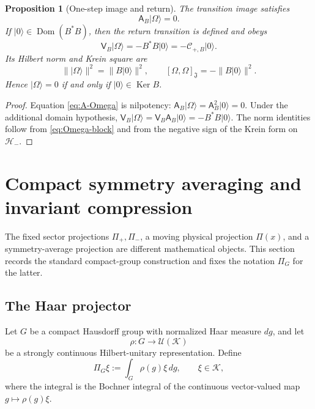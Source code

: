 \documentclass[11pt,reqno]{scrartcl}
\newcommand{\scrK}{\mathscr K}
\newcommand{\scrHm}{\mathscr H_{-}}
\newcommand{\fundJ}{\mathfrak J}
\newcommand{\Pp}{\Pi_{+}}
\newcommand{\Pm}{\Pi_{-}}
\newcommand{\Aop}{\mathsf A}
\newcommand{\Vop}{\mathsf V}
\newcommand{\ket}[1]{\lvert #1\rangle}
\newcommand{\kInner}[2]{[#1,#2]_{\fundJ}}
\DeclareMathOperator{\Dom}{Dom}
\DeclareMathOperator{\Ker}{Ker}
\theoremstyle{plain}
\newtheorem{proposition}[proposition]{Proposition}
\theoremstyle{definition}
\theoremstyle{remark}
\begin{document}
\begin{proposition}[One-step image and return]
\label{prop:Omega}
The transition image satisfies
\begin{equation}
  \boxed{\Aop_B\ket\Omega=0.}
  \label{eq:A-Omega}
\end{equation}
If \(\ket0\in\Dom(B^*B)\), then the return transition is defined and obeys
\begin{equation}
  \Vop_B\ket\Omega
  =-B^*B\ket0
  =-\mathscr C_{+,B}\ket0.
  \label{eq:V-Omega}
\end{equation}
Its Hilbert norm and Krein square are
\begin{equation}
  \|\ket\Omega\|^2=\|B\ket0\|^2,
  \qquad
  \kInner{\Omega}{\Omega}=-\|B\ket0\|^2.
  \label{eq:Omega-norms}
\end{equation}
Hence \(\ket\Omega=0\) if and only if \(\ket0\in\Ker B\).
\end{proposition}

\begin{proof}
Equation \eqref{eq:A-Omega} is nilpotency:
\(\Aop_B\ket\Omega=\Aop_B^2\ket0=0\). Under the additional domain
hypothesis,
\(\Vop_B\ket\Omega=\Vop_B\Aop_B\ket0=-B^*B\ket0\). The norm identities
follow from \eqref{eq:Omega-block} and from the negative sign of the Krein
form on \(\scrHm\).
\end{proof}


\section{Compact symmetry averaging and invariant compression}
\label{sec:symmetry-averaging}

The fixed sector projections \(\Pp,\Pm\), a moving physical projection
\(\Pi(x)\), and a symmetry-average projection are different mathematical
objects.  This section records the standard compact-group construction and
fixes the notation \(\Pi_G\) for the latter.

\subsection{The Haar projector}

Let \(G\) be a compact Hausdorff group with normalized Haar measure \(dg\),
and let
\begin{equation}
  \rho:G\longrightarrow\mathcal U(\scrK)
  \label{eq:unitary-representation}
\end{equation}
be a strongly continuous Hilbert-unitary representation.  Define
\begin{equation}
  \Pi_G\xi
  :=\int_G\rho(g)\xi\,dg,
  \qquad \xi\in\scrK,
  \label{eq:Haar-projector}
\end{equation}
where the integral is the Bochner integral of the continuous vector-valued
map \(g\mapsto\rho(g)\xi\).
\end{document}
